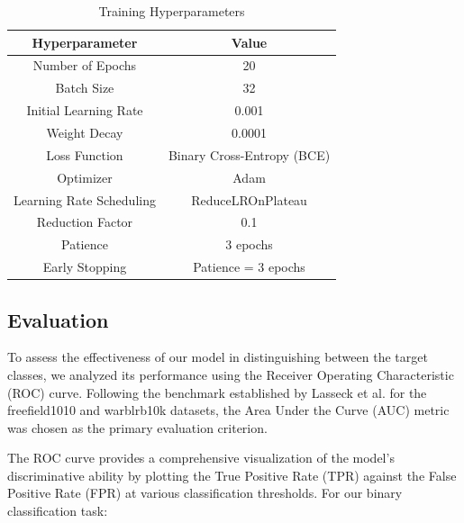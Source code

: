      \begin{table}[h]
            \centering
            \caption{Training Hyperparameters}
            \label{tab:training_hyperparameters}
            \begin{tabular}{|c|c|}
                \hline
                \textbf{Hyperparameter} & \textbf{Value} \\
                \hline
                Number of Epochs & 20 \\
                \hline
                Batch Size & 32 \\
                \hline
                Initial Learning Rate & 0.001 \\
                \hline
                Weight Decay & 0.0001 \\
                \hline
                Loss Function & Binary Cross-Entropy (BCE) \\
                \hline
                Optimizer & Adam \\
                \hline
                Learning Rate Scheduling & ReduceLROnPlateau \\
                \hline
                Reduction Factor & 0.1 \\
                \hline
                Patience & 3 epochs \\
                \hline
                Early Stopping & Patience = 3 epochs \\
                \hline
            \end{tabular}
      \end{table}
            
            
      \subsection{Evaluation}
      To assess the effectiveness of our model in distinguishing between the target classes, we analyzed its performance using the Receiver Operating Characteristic (ROC) curve. Following the benchmark established by Lasseck et al.\cite{lasseck2018acoustic} for the freefield1010 and warblrb10k datasets, the Area Under the Curve (AUC) metric was chosen as the primary evaluation criterion.

      The ROC curve provides a comprehensive visualization of the model's discriminative ability by plotting the True Positive Rate (TPR) against the False Positive Rate (FPR) at various classification thresholds. For our binary classification task:

